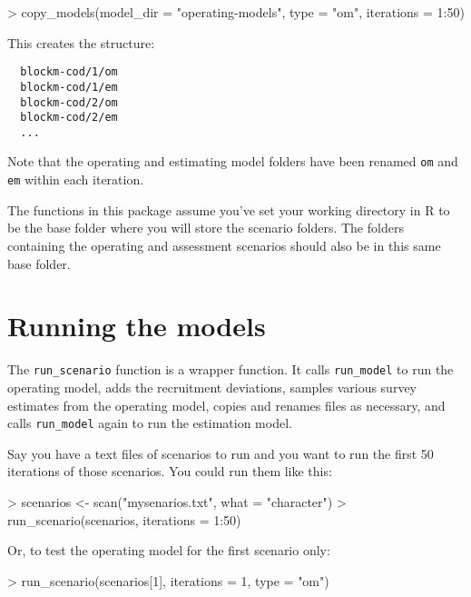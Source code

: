 \documentclass[12pt]{article}
\begin{document}
\begin{Schunk}
\begin{Sinput}
> copy_models(model_dir = "operating-models", type = "om", iterations = 1:50)
\end{Sinput}
\end{Schunk}

\noindent
This creates the structure:

\begin{verbatim}
  blockm-cod/1/om
  blockm-cod/1/em
  blockm-cod/2/om
  blockm-cod/2/em
  ...
\end{verbatim}

\noindent
Note that the operating and estimating model folders have been renamed
\texttt{om} and \texttt{em} within each iteration.

The functions in this package assume you've set your working directory
in R to be the base folder where you will store the scenario folders. The
folders containing the operating and assessment scenarios should also be in this
same base folder.

\section*{Running the models}

The \texttt{run\_scenario} function is a wrapper function. It calls
\texttt{run\_model} to run the operating model, adds the recruitment deviations,
samples various survey estimates from the operating model, copies and renames
files as necessary, and calls \texttt{run\_model} again to run the estimation
model.

Say you have a text files of scenarios to run and you want to run the first 50
iterations of those scenarios. You could run them like this:

\begin{Schunk}
\begin{Sinput}
> scenarios <- scan("mysenarios.txt", what = "character")
> run_scenario(scenarios, iterations = 1:50)
\end{Sinput}
\end{Schunk}

\noindent
Or, to test the operating model for the first scenario only:

\begin{Schunk}
\begin{Sinput}
> run_scenario(scenarios[1], iterations = 1, type = "om")
\end{Sinput}
\end{Schunk}
\end{document}
